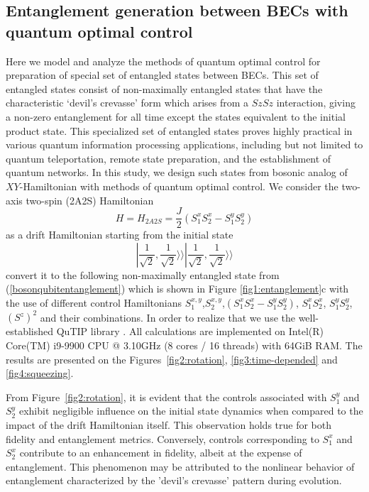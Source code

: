 \documentclass[
aps,%
12pt,%
final,%
notitlepage,%
oneside,%
onecolumn,%
nobibnotes,%
nofootinbib,%
superscriptaddress,%
noshowpacs,%
centertags]%
{revtex4}
\begin{document}
\subsection{Entanglement generation between BECs with quantum optimal control}

Here we model and analyze the methods of quantum optimal control for preparation of special set of entangled states between BECs. This set of entangled states consist of non-maximally entangled states that have the characteristic ‘devil’s crevasse’ form which arises from a $SzSz$ interaction, giving a non-zero entanglement for all time except the states equivalent to the initial product state. This specialized set of entangled states proves highly practical in various quantum information processing applications, including but not limited to quantum teleportation, remote state preparation, and the establishment of quantum networks. In this study, we design such states from bosonic analog of $XY$-Hamiltonian with methods of quantum optimal control. We consider the two-axis two-spin (2A2S) Hamiltonian $$H = H_{2A2S} = \frac{J}{2} (S_1^x S_2^x - S_1^y S_2^y)$$ as a drift Hamiltonian  starting from the initial state $$| \frac{1}{\sqrt{2}}, \frac{1}{\sqrt{2}} \rangle \rangle | \frac{1}{\sqrt{2}}, \frac{1}{\sqrt{2}} \rangle \rangle$$ convert it to the following non-maximally entangled state from (\ref{bosonqubitentanglement}) which is shown in Figure \ref{fig1:entanglement}c with the use of different control Hamiltonians $S_1^{x,y}$,$S_2^{x,y}$,$(S_1^x S_2^x - S_1^y S_2^y)$, $S_1^x S_2^x$, $S_1^y S_2^y$, $(S^z)^2$ and their combinations.
In order to realize that we use the well-established QuTIP library \cite{}. All calculations are implemented on Intel(R) Core(TM) i9-9900 CPU @ 3.10GHz (8 cores / 16 threads) with 64GiB RAM. The results are presented on the Figures~\ref{fig2:rotation}, \ref{fig3:time-depended} and \ref{fig4:squeezing}. 

From Figure~\ref{fig2:rotation}, it is evident that the controls associated with $S_1^y$ and $S_2^y$ exhibit negligible influence on the initial state dynamics when compared to the impact of the drift Hamiltonian itself. This observation holds true for both fidelity and entanglement metrics. Conversely, controls corresponding to $S_1^x$ and $S_2^x$ contribute to an enhancement in fidelity, albeit at the expense of entanglement. This phenomenon may be attributed to the nonlinear behavior of entanglement characterized by the 'devil’s crevasse' pattern during evolution.
\end{document}
